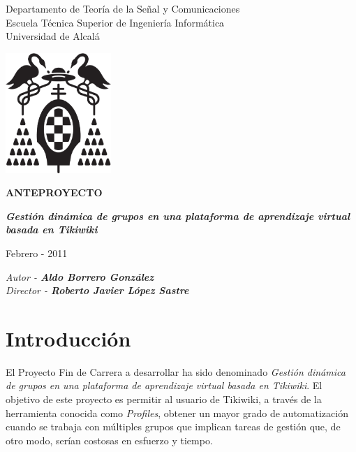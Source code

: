 \documentclass[12pt,oneside,a4paper]{article}
\begin{document}
\thispagestyle{empty}

\begin{center}


Departamento de Teoría de la Señal y Comunicaciones\\
Escuela Técnica Superior de Ingeniería Informática\\
Universidad de Alcalá\\

\vspace{1cm}

\includegraphics[width=4cm]{figuras/logo-uah.eps}

\textbf{ANTEPROYECTO}

\vspace{1cm}

\begin{large}\textbf{\textit{Gestión dinámica de grupos en una plataforma de aprendizaje virtual basada en Tikiwiki}}\end{large}

\vfill

Febrero - 2011

\end{center}

\begin{flushright}
\textit{Autor - \textbf{Aldo Borrero González}} \\
\textit{Director - \textbf{Roberto Javier López Sastre}}
\end{flushright}

\newpage

\section{Introducción}

El Proyecto Fin de Carrera a desarrollar ha sido denominado \textit{Gestión dinámica de grupos en una plataforma de aprendizaje virtual basada en Tikiwiki}. El objetivo de este proyecto es permitir al usuario de Tikiwiki, a través de la herramienta conocida como \textit{Profiles}\cite{Profiles}, obtener un mayor grado de automatización cuando se trabaja con múltiples grupos que implican tareas de gestión que, de otro modo, serían costosas en esfuerzo y tiempo.
\end{document}
